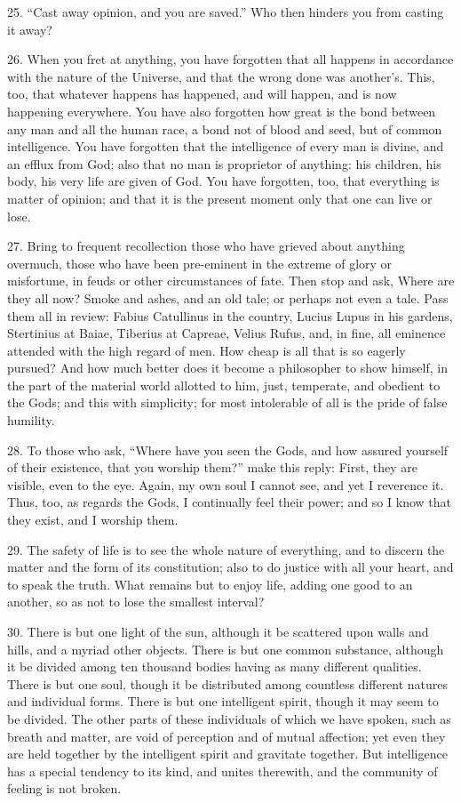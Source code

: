 \documentclass{book}
\begin{document}
25. ``Cast away opinion, and you are saved.'' Who then hinders you from
casting it away?

26. When you fret at anything, you have forgotten that all happens in
accordance with the nature of the Universe, and that the wrong done
was another's. This, too, that whatever happens has happened, and will
happen, and is now happening everywhere. You have also forgotten how
great is the bond between any man and all the human race, a bond not
of blood and seed, but of common intelligence. You have forgotten that
the intelligence of every man is divine, and an efflux from God; also
that no man is proprietor of anything: his children, his body, his
very life are given of God. You have forgotten, too, that everything is
matter of opinion; and that it is the present moment only that one can
live or lose.

27. Bring to frequent recollection those who have grieved about
anything overmuch, those who have been pre-eminent in the extreme of
glory or misfortune, in feuds or other circumstances of fate. Then
stop and ask, Where are they all now? Smoke and ashes, and an old
tale; or perhaps not even a tale. Pass them all in review: Fabius
Catullinus in the country, Lucius Lupus in his gardens, Stertinius at
Baiae, Tiberius at Capreae, Velius Rufus, and, in fine, all eminence
attended with the high regard of men. How cheap is all that is so
eagerly pursued? And how much better does it become a philosopher to
show himself, in the part of the material world allotted to him, just,
temperate, and obedient to the Gods; and this with simplicity; for
most intolerable of all is the pride of false humility.

28. To those who ask, ``Where have you seen the Gods, and how assured
yourself of their existence, that you worship them?'' make this reply:
First, they are visible, even to the eye. Again, my own soul I cannot
see, and yet I reverence it. Thus, too, as regards the Gods, I
continually feel their power; and so I know that they exist, and I
worship them.

29. The safety of life is to see the whole nature of everything, and
to discern the matter and the form of its constitution; also to do
justice with all your heart, and to speak the truth. What remains but
to enjoy life, adding one good to an another, so as not to lose the
smallest interval?

30. There is but one light of the sun, although it be scattered upon
walls and hills, and a myriad other objects. There is but one common
substance, although it be divided among ten thousand bodies having as
many different qualities.  There is but one soul, though it be
distributed among countless different natures and individual
forms. There is but one intelligent spirit, though it may seem to be
divided. The other parts of these individuals of which we have spoken,
such as breath and matter, are void of perception and of mutual
affection; yet even they are held together by the intelligent spirit
and gravitate together. But intelligence has a special tendency to its
kind, and unites therewith, and the community of feeling is not
broken.
\end{document}
